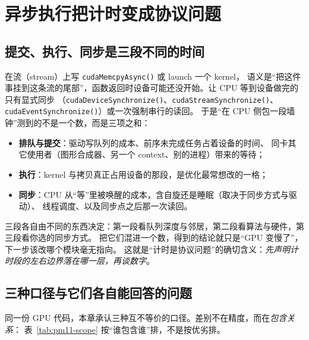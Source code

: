 \documentclass[12pt,a4paper,fontset=fandol]{ctexbook}
\newcommand{\Fn}[1]{\texttt{#1()}}
\newcommand{\Bk}{\discretionary{}{}{}}
\begin{document}
\section{异步执行把计时变成协议问题}
\label{sec:pm11-async}

\subsection{提交、执行、同步是三段不同的时间}
\label{sub:pm11-queue}

在流（stream）上写 \Fn{cudaMem{\Bk}cpy{\Bk}Async} 或 launch 一个 kernel，
语义是``把这件事挂到这条流的尾部''，函数返回时设备可能还没开始。让 CPU 等到设备做完的只有显式同步
（\Fn{cudaDevice{\Bk}Synchronize}、\Fn{cudaStream{\Bk}Synchronize}、
\Fn{cudaEvent{\Bk}Synchronize}）或一次强制串行的读回。
于是``在 CPU 侧包一段墙钟''测到的不是一个数，而是三项之和：

\begin{itemize}
  \item \textbf{排队与提交}：驱动写队列的成本、前序未完成任务占着设备的时间、
        同卡其它使用者（图形合成器、另一个 context、别的进程）带来的等待；
  \item \textbf{执行}：kernel 与拷贝真正占用设备的那段，是优化最常想改的一格；
  \item \textbf{同步}：CPU 从``等''里被唤醒的成本，含自旋还是睡眠（取决于同步方式与驱动）、
        线程调度、以及同步点之后那一次读回。
\end{itemize}

三段各自由不同的东西决定：第一段看队列深度与邻居，第二段看算法与硬件，第三段看你选的同步方式。
把它们混进一个数，得到的结论就只是``GPU 变慢了''，下一步该改哪个模块毫无指向。
这就是``计时是协议问题''的确切含义：\emph{先声明计时段的左右边界落在哪一层，再谈数字}。

\subsection{三种口径与它们各自能回答的问题}
\label{sub:pm11-three-scope}

同一份 GPU 代码，本章承认三种互不等价的口径。差别不在精度，而在\emph{包含关系}：
表~\ref{tab:pm11-scope} 按``谁包含谁''排，不是按优劣排。
\end{document}
